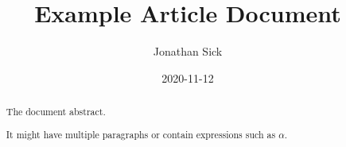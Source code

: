 \documentclass[11pt,twoside,letter]{article}
\begin{document}
\title{Example Article Document}
\author{Jonathan Sick}
\date{2020-11-12}
\maketitle

\begin{abstract}
The document abstract.

It might have multiple paragraphs or contain expressions such as $\alpha$.
\end{abstract}
\end{document}
